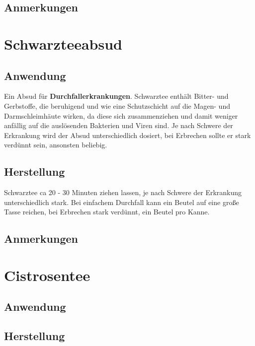 \subsection{Anmerkungen}






\section{Schwarzteeabsud}

\subsection{Anwendung}

Ein Absud für \textbf{Durchfallerkrankungen}. Schwarztee enthält Bitter- und Gerbstoffe, die beruhigend und wie eine Schutzschicht auf die Magen- und Darmschleimhäute wirken, da diese sich zusammenziehen und damit weniger anfällig auf die auslösenden Bakterien und Viren sind. Je nach Schwere der Erkrankung wird der Absud unterschiedlich dosiert, bei Erbrechen sollte er stark verdünnt sein, ansonsten beliebig.

\subsection{Herstellung}

Schwarztee ca 20 - 30 Minuten ziehen lassen, je nach Schwere der Erkrankung unterschiedlich stark. Bei einfachem Durchfall kann ein Beutel auf eine große Tasse reichen, bei Erbrechen stark verdünnt, ein Beutel pro Kanne.

\subsection{Anmerkungen}





\section{Cistrosentee}

\subsection{Anwendung}

\subsection{Herstellung}

